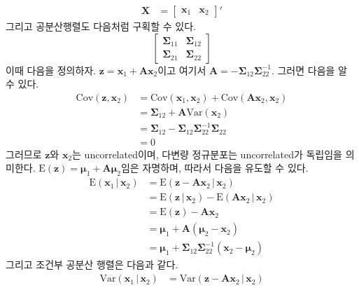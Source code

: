 \documentclass[answers]{exam}
\newcommand{\bs}{\boldsymbol}
\begin{document}
\begin{questions}
\begin{solution}
\begin{enumerate}[(a)]
\begin{align}
        \mathbf{X} &= \begin{bmatrix}\mathbf{x}_{1}&\mathbf{x}_{2}\end{bmatrix}'
      \end{align}
      그리고 공분산행렬도 다음처럼 구획할 수 있다.
      \begin{equation}
        \begin{bmatrix}\bs{\Sigma}_{11}&\bs{\Sigma}_{12}\\\bs{\Sigma}_{21} &\bs{\Sigma}_{22} \end{bmatrix}
      \end{equation}
      이때 다음을 정의하자. $\mathbf{z}=\mathbf{x}_{1}+\mathbf{Ax}_{2}$이고 여기서 $\mathbf{A}=-\bs{\Sigma}_{12}\bs{\Sigma}_{22}^{-1}$. 그러면 다음을 알 수 있다.
      \begin{align}
        \mathrm{Cov}\left(\mathbf{z},\mathbf{x}_{2}\right) &= \mathrm{Cov}\left(\mathbf{x}_{1},\mathbf{x}_{2}\right)+\mathrm{Cov}\left(\mathbf{Ax}_{2},\mathbf{x}_{2}\right)\\
        &=\bs{\Sigma}_{12}+\mathbf{A}\mathrm{Var}\left(\mathbf{x}_{2}\right)\\
        &=\bs{\Sigma}_{12}-\bs{\Sigma}_{12}\bs{\Sigma}_{22}^{-1}\bs{\Sigma}_{22}\\
        &= 0
      \end{align}
      그러므로 $\mathbf{z}$와 $\mathbf{x}_{2}$는 uncorrelated이며, 다변량 정규분포는 uncorrelated가 독립임을 의미한다. $\mathrm{E}\left(\mathbf{z}\right)=\bs{\mu}_{1}+\mathbf{A}\bs{\mu}_{2}$임은 자명하며, 따라서 다음을 유도할 수 있다.
      \begin{align}
        \mathrm{E}\left(\mathbf{x}_{1}\,|\,\mathbf{x}_{2}\right) &= \mathrm{E}\left(\mathbf{z}-\mathbf{Ax}_{2}\,|\,\mathbf{x}_{2}\right)\\
        &=\mathrm{E}\left(\mathbf{z}\,|\,\mathbf{x}_{2}\right)-\mathrm{E}\left(\mathbf{Ax}_{2}\,|\,\mathbf{x}_{2}\right)\\
        &= \mathrm{E}\left(\mathbf{z}\right)-\mathbf{Ax}_{2}\\
        &= \bs{\mu}_{1}+\mathbf{A}\left(\bs{\mu}_{2}-\mathbf{x}_{2}\right)\\
        &= \bs{\mu}_{1}+\bs{\Sigma}_{12}\bs{\Sigma}_{22}^{-1}\left(\mathbf{x}_{2}-\bs{\mu}_{2}\right)
      \end{align}
      그리고 조건부 공분산 행렬은 다음과 같다.
      \begin{align}
        \mathrm{Var}\left(\mathbf{x}_{1}\,|\,\mathbf{x}_{2}\right) &= \mathrm{Var}\left(\mathbf{z}-\mathbf{Ax}_{2}\,|\,\mathbf{x}_{2}\right)\\

\end{align}
\end{enumerate}
\end{solution}
\end{questions}
\end{document}
